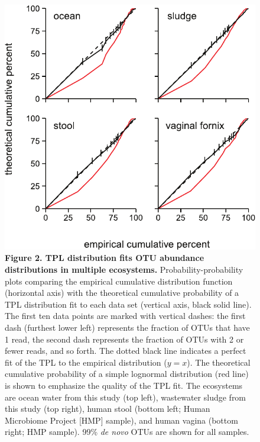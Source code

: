 \clearpage
\begin{figure}[ht]
\centering
\includegraphics{texmex/fig/fig_2}
\caption*{{\bf Figure 2. TPL distribution fits OTU abundance distributions in multiple ecosystems.}
Probability-probability plots comparing the empirical cumulative distribution
function (horizontal axis) with the theoretical cumulative probability of a TPL
distribution fit to each data set (vertical axis, black solid line). The first
ten data points are marked with vertical dashes: the first dash (furthest lower
left) represents the fraction of OTUs that have 1 read, the second dash
represents the fraction of OTUs with 2 or fewer reads, and so forth. The dotted
black line indicates a perfect fit of the TPL to the empirical distribution ($y = x$).
The theoretical cumulative probability of a simple lognormal distribution
(red line) is shown to emphasize the quality of the TPL fit. The ecosystems are
ocean water from this study (top left), wastewater sludge from this study (top
right), human stool (bottom left; Human Microbiome Project [HMP] sample), and
human vagina (bottom right; HMP sample). 99\% \textit{de novo} OTUs are shown for all
samples.}
\end{figure}

